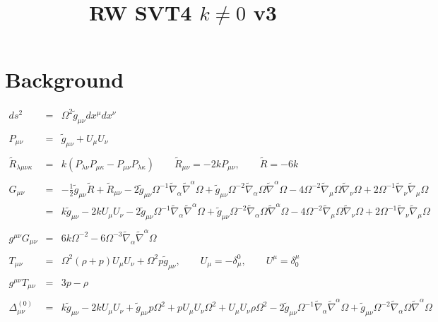 \documentclass[10pt,letterpaper]{article}
\title{RW SVT4 $k\ne 0$ v3}
\date{}
\numberwithin{equation}{section}
\begin{document}
 
\maketitle
\noindent 
\section{Background}

\begin{eqnarray}
ds^2 &=& \Omega^2\tilde g_{\mu\nu} dx^\mu dx^\nu
\label{geom}
\\ \nonumber\\
P_{\mu\nu} &=& \tilde g_{\mu\nu}+U_{\mu}U_\nu
\\ \nonumber\\
\tilde R_{\lambda\mu\nu\kappa} &=& k (P_{\lambda\nu}P_{\mu\kappa}-P_{\mu\nu}P_{\lambda\kappa})
\qquad
\tilde R_{\mu\nu} = -2k P_{\mu\nu},\qquad \tilde R= -6k 
\label{Ricci}
\\ \nonumber\\
G_{\mu\nu}&=& - \tfrac{1}{2} \tilde{g}_{\mu \nu } \tilde R + \tilde R_{\mu \nu } - 2 \tilde{g}_{\mu \nu } \Omega^{-1} \tilde{\nabla}_{\alpha }\tilde{\nabla}^{\alpha }\Omega + \tilde{g}_{\mu \nu } \Omega^{-2} \tilde{\nabla}_{\alpha }\Omega \tilde{\nabla}^{\alpha }\Omega - 4 \Omega^{-2} \tilde{\nabla}_{\mu }\Omega \tilde{\nabla}_{\nu }\Omega + 2 \Omega^{-1} \tilde{\nabla}_{\nu }\tilde{\nabla}_{\mu }\Omega 
 \nonumber\\
&=& k \tilde{g}_{\mu \nu } - 2 k U_{\mu } U_{\nu } - 2 \tilde{g}_{\mu \nu } \Omega^{-1} \tilde{\nabla}_{\alpha }\tilde{\nabla}^{\alpha }\Omega + \tilde{g}_{\mu \nu } \Omega^{-2} \tilde{\nabla}_{\alpha }\Omega \tilde{\nabla}^{\alpha }\Omega - 4 \Omega^{-2} \tilde{\nabla}_{\mu }\Omega \tilde{\nabla}_{\nu }\Omega + 2 \Omega^{-1} \tilde{\nabla}_{\nu }\tilde{\nabla}_{\mu }\Omega 
\\ \nonumber\\
g^{\mu\nu}G_{\mu\nu} &=& 6 k \Omega^{-2} - 6 \Omega^{-3} \tilde{\nabla}_{\alpha }\tilde{\nabla}^{\alpha }\Omega 
\\ \nonumber\\
T_{\mu\nu} &=& \Omega^2(\rho+p)U_\mu U_\nu + \Omega^2 p\tilde g_{\mu\nu},\qquad U_\mu = -\delta^0_\mu,\qquad U^\mu = \delta^\mu_0
\\ \nonumber\\
g^{\mu\nu}T_{\mu\nu} &=& 3p-\rho
\\ \nonumber\\
\Delta_{\mu\nu}^{(0)}&=& k \tilde{g}_{\mu \nu } - 2 k U_{\mu } U_{\nu } + \tilde{g}_{\mu \nu } p \Omega^2 + p U_{\mu } U_{\nu } \Omega^2 + U_{\mu } U_{\nu } \rho \Omega^2 - 2 \tilde{g}_{\mu \nu } \Omega^{-1} \tilde{\nabla}_{\alpha }\tilde{\nabla}^{\alpha }\Omega + \tilde{g}_{\mu \nu } \Omega^{-2} \tilde{\nabla}_{\alpha }\Omega \tilde{\nabla}^{\alpha }\Omega \nonumber \\ 

\end{eqnarray}
\end{document}
